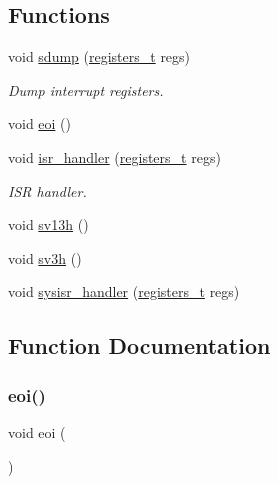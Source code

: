 \subsection*{Functions}
\begin{DoxyCompactItemize}
\item 
void \hyperlink{a00101_a4b4233daef6e041e7278cae2b21b5ed4_a4b4233daef6e041e7278cae2b21b5ed4}{sdump} (\hyperlink{a00104_adf58dbaf6139b4957c348711f2026957_adf58dbaf6139b4957c348711f2026957}{registers\+\_\+t} regs)
\begin{DoxyCompactList}\small\item\em Dump interrupt registers. \end{DoxyCompactList}\item 
void \hyperlink{a00101_a4af3b3eec03921259f5db474506c0c8d_a4af3b3eec03921259f5db474506c0c8d}{eoi} ()
\item 
void \hyperlink{a00101_a700e3ca056bf69296370f504f2cb6cc8_a700e3ca056bf69296370f504f2cb6cc8}{isr\+\_\+handler} (\hyperlink{a00104_adf58dbaf6139b4957c348711f2026957_adf58dbaf6139b4957c348711f2026957}{registers\+\_\+t} regs)
\begin{DoxyCompactList}\small\item\em I\+SR handler. \end{DoxyCompactList}\item 
void \hyperlink{a00101_aeeac7331d1a449871656eeb6ac73fd25_aeeac7331d1a449871656eeb6ac73fd25}{sv13h} ()
\item 
void \hyperlink{a00101_ad118f86f4af40a3b4b94bc7c4977e762_ad118f86f4af40a3b4b94bc7c4977e762}{sv3h} ()
\item 
void \hyperlink{a00101_abd1fa375737cd5ecd84c082738e3b195_abd1fa375737cd5ecd84c082738e3b195}{sysisr\+\_\+handler} (\hyperlink{a00104_adf58dbaf6139b4957c348711f2026957_adf58dbaf6139b4957c348711f2026957}{registers\+\_\+t} regs)
\end{DoxyCompactItemize}


\subsection{Function Documentation}
\mbox{\label{a00101_a4af3b3eec03921259f5db474506c0c8d_a4af3b3eec03921259f5db474506c0c8d}} 
\subsubsection{\texorpdfstring{eoi()}{eoi()}}
{\footnotesize\ttfamily void eoi (\begin{DoxyParamCaption}{ }\end{DoxyParamCaption})}



